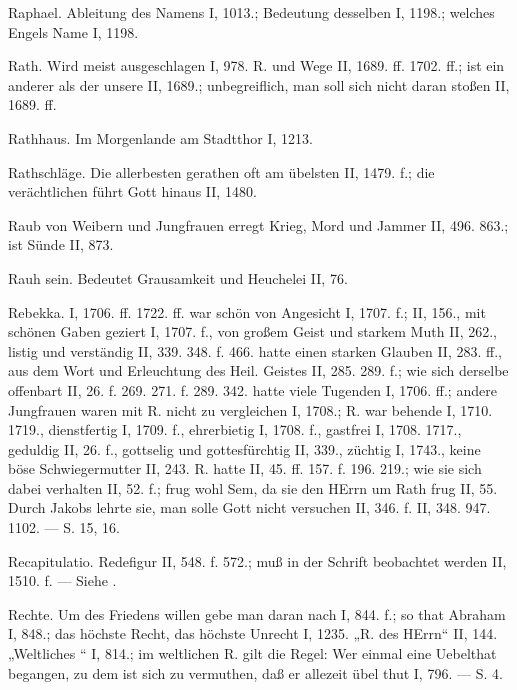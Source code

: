 Raphael. Ableitung des Namens I, 1013.; Bedeutung desselben I, 1198.; welches Engels Name I, 1198.

Rath. Wird meist ausgeschlagen I, 978.  R. und Wege II, 1689. ff. 1702. ff.; ist ein anderer als der unsere II, 1689.; unbegreiflich, man soll sich nicht daran stoßen II, 1689. ff.

Rathhaus. Im Morgenlande am Stadtthor I, 1213.

Rathschläge. Die allerbesten gerathen oft am übelsten II, 1479. f.; die verächtlichen führt Gott hinaus II, 1480.

Raub von Weibern und Jungfrauen erregt Krieg, Mord und Jammer II, 496. 863.; ist Sünde II, 873.

Rauh sein. Bedeutet Grausamkeit und Heuchelei II, 76.

Rebekka. I, 1706. ff. 1722. ff.  war schön von Angesicht I, 1707. f.; II, 156., mit schönen Gaben geziert I, 1707. f., von großem Geist und starkem Muth II, 262., listig und verständig II, 339. 348. f. 466.  hatte einen starken Glauben II, 283. ff., aus dem Wort und Erleuchtung des Heil. Geistes II, 285. 289. f.; wie sich derselbe offenbart II, 26. f. 269. 271. f. 289. 342.  hatte viele Tugenden I, 1706. ff.; andere Jungfrauen waren mit R. nicht zu vergleichen I, 1708.; R. war behende I, 1710. 1719., dienstfertig I, 1709. f., ehrerbietig I, 1708. f., gastfrei I, 1708. 1717., geduldig II, 26. f., gottselig und gottesfürchtig II, 339., züchtig I, 1743., keine böse Schwiegermutter II, 243. R. hatte  II, 45. ff. 157. f. 196. 219.; wie sie sich dabei verhalten II, 52. f.; frug wohl Sem, da sie den HErrn um Rath frug II, 55. Durch  Jakobs lehrte sie, man solle Gott nicht versuchen II, 346. f.  II, 348. 947. 1102. — S.  15, 16.

Recapitulatio. Redefigur II, 548. f. 572.; muß in der Schrift beobachtet werden II, 1510. f. — Siehe .

Rechte. Um des Friedens willen gebe man daran nach I, 844. f.; so that Abraham I, 848.; das höchste Recht, das höchste Unrecht I, 1235. „R. des HErrn“ II, 144. „Weltliches “ I, 814.; im weltlichen R. gilt die Regel: Wer einmal eine Uebelthat begangen, zu dem ist sich zu vermuthen, daß er allezeit übel thut I, 796. — S.  4.

